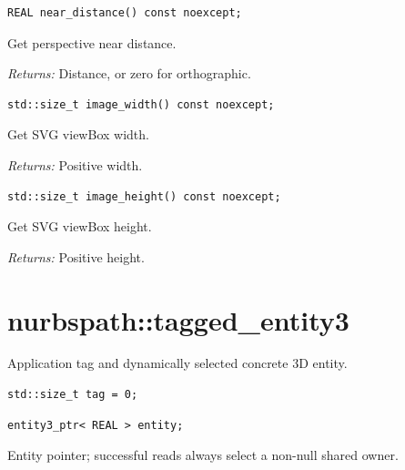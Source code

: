 \par\noindent\begin{minipage}{\linewidth}
\begin{lstlisting}[style=apireference]
REAL near_distance() const noexcept;
\end{lstlisting}
{\footnotesize Get perspective near distance.\par}
{\footnotesize\textit{Returns:} Distance, or zero for orthographic.\par}
\end{minipage}\par\vspace{1pt}
\par\noindent\begin{minipage}{\linewidth}
\begin{lstlisting}[style=apireference]
std::size_t image_width() const noexcept;
\end{lstlisting}
{\footnotesize Get SVG viewBox width.\par}
{\footnotesize\textit{Returns:} Positive width.\par}
\end{minipage}\par\vspace{1pt}
\par\noindent\begin{minipage}{\linewidth}
\begin{lstlisting}[style=apireference]
std::size_t image_height() const noexcept;
\end{lstlisting}
{\footnotesize Get SVG viewBox height.\par}
{\footnotesize\textit{Returns:} Positive height.\par}
\end{minipage}\par\vspace{1pt}
\section{nurbspath::tagged\_entity3}
Application tag and dynamically selected concrete 3D entity.
\par\noindent\begin{minipage}{\linewidth}
\begin{lstlisting}[style=apireference]
std::size_t tag = 0;
\end{lstlisting}
\end{minipage}\par\vspace{1pt}
\par\noindent\begin{minipage}{\linewidth}
\begin{lstlisting}[style=apireference]
entity3_ptr< REAL > entity;
\end{lstlisting}
{\footnotesize Entity pointer; successful reads always select a non-null shared owner.\par}
\end{minipage}\par\vspace{1pt}
